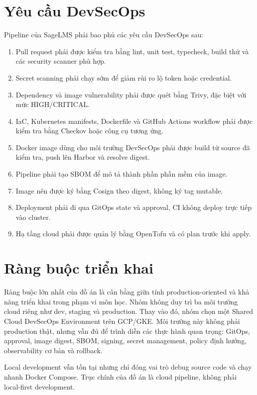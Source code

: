 \section{Yêu cầu DevSecOps}

Pipeline của SageLMS phải bao phủ các yêu cầu DevSecOps sau:

\begin{enumerate}
  \item Pull request phải được kiểm tra bằng lint, unit test, typecheck, build thử và các security scanner phù hợp.
  \item Secret scanning phải chạy sớm để giảm rủi ro lộ token hoặc credential.
  \item Dependency và image vulnerability phải được quét bằng Trivy, đặc biệt với mức HIGH/CRITICAL.
  \item IaC, Kubernetes manifests, Dockerfile và GitHub Actions workflow phải được kiểm tra bằng Checkov hoặc công cụ tương ứng.
  \item Docker image dùng cho môi trường DevSecOps phải được build từ source đã kiểm tra, push lên Harbor và resolve digest.
  \item Pipeline phải tạo SBOM để mô tả thành phần phần mềm của image.
  \item Image nên được ký bằng Cosign theo digest, không ký tag mutable.
  \item Deployment phải đi qua GitOps state và approval, CI không deploy trực tiếp vào cluster.
  \item Hạ tầng cloud phải được quản lý bằng OpenTofu và có plan trước khi apply.
\end{enumerate}

\section{Ràng buộc triển khai}

Ràng buộc lớn nhất của đồ án là cân bằng giữa tính production-oriented và khả năng triển khai trong phạm vi môn học. Nhóm không duy trì ba môi trường cloud riêng như dev, staging và production. Thay vào đó, nhóm chọn một Shared Cloud DevSecOps Environment trên GCP/GKE. Môi trường này không phải production thật, nhưng vẫn đủ để trình diễn các thực hành quan trọng: GitOps, approval, image digest, SBOM, signing, secret management, policy định hướng, observability cơ bản và rollback.

Local development vẫn tồn tại nhưng chỉ đóng vai trò debug source code và chạy nhanh Docker Compose. Trục chính của đồ án là cloud pipeline, không phải local-first development.

